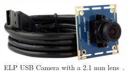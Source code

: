 \begin{figure}[h]
  \centering
  \includegraphics[width=2.5in]{figures/camera.jpg}
  \caption[ELP USB Camera with 2.1 mm Lens]{ELP USB Camera with a 2.1 mm
    lens~\cite{webcam}.
}
%
  \label{fig:camera}
\end{figure}

